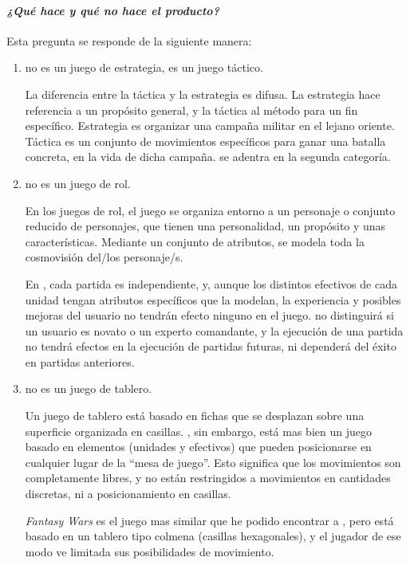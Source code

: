 \paragraph{\emph{¿Qué hace y qué no hace el producto?}}
Esta pregunta se responde de la siguiente manera:
\begin{enumerate}
\item \gom no es un juego de estrategia, es un juego táctico.

La diferencia entre la táctica y la estrategia es difusa. La estrategia hace referencia a un propósito general, y la táctica al método para un fin específico. Estrategia es organizar una campaña militar en el lejano oriente. Táctica es un conjunto de movimientos específicos para ganar una batalla concreta, en la vida de dicha campaña. \gom se adentra en la segunda categoría.
 
\item \gom no es un juego de rol.

En los juegos de rol, el juego se organiza entorno a un personaje o conjunto reducido de personajes, que tienen una personalidad, un propósito y unas características. Mediante un conjunto de atributos, se modela toda la cosmovisión del/los personaje/s.

En \gomf, cada partida es independiente, y, aunque los distintos efectivos de cada unidad tengan atributos específicos que la modelan, la experiencia y posibles mejoras del usuario no tendrán efecto ninguno en el juego. \gom no distinguirá si un usuario es novato o un experto comandante, y la ejecución de una partida no tendrá efectos en la ejecución de partidas futuras, ni dependerá del éxito en partidas anteriores.

\item \gom no es un juego de tablero.

Un juego de tablero está basado en fichas que se desplazan sobre una
superficie organizada en casillas. \gomf, sin embargo, está mas bien un juego basado en elementos (unidades y efectivos) que pueden posicionarse en cualquier lugar de la ``mesa de juego''. Esto significa que los movimientos son completamente libres, y no están restringidos a movimientos en cantidades discretas, ni a posicionamiento en casillas.

\textit{Fantasy Wars} es el juego mas similar que he podido encontrar a \gom, pero está basado en un tablero tipo colmena (casillas hexagonales), y el jugador de ese modo ve limitada sus posibilidades de movimiento.

\end{enumerate}

